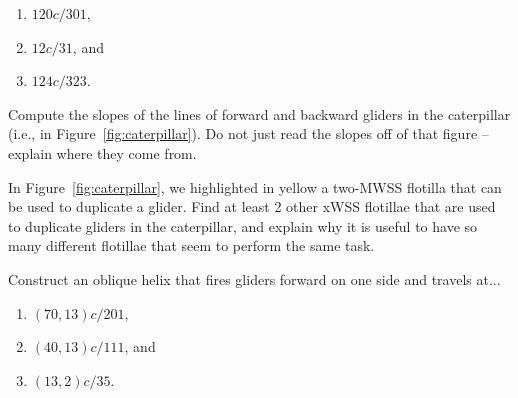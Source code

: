 \begin{multicols}{2}
\begin{problem}
	\begin{enumerate}[label=\bf\color{ocre}(\alph*)]
		\item $120c/301$,%
		
		\item $12c/31$, and%
		
		\item $124c/323$.%
	\end{enumerate}
\end{problem}


\mfilbreak


\begin{problem}\label{exer:caterpillar_glider_slopes}
	Compute the slopes of the lines of forward and backward gliders in the caterpillar (i.e., in Figure~\ref{fig:caterpillar}). Do not just read the slopes off of that figure -- explain where they come from.
\end{problem}


\mfilbreak


\begin{problem}\label{exer:caterpillar_glider_duplicate}
	In Figure~\ref{fig:caterpillar}, we highlighted in yellow a two-MWSS flotilla that can be used to duplicate a glider. Find at least 2 other xWSS flotillae that are used to duplicate gliders in the caterpillar, and explain why it is useful to have so many different flotillae that seem to perform the same task.
\end{problem}


\mfilbreak


\begin{problem}\label{exer:construct_oblique_helix}
	Construct an oblique helix that fires gliders forward on one side and travels at...
	
	\begin{enumerate}[label=\bf\color{ocre}(\alph*)]
		\item $(70,13)c/201$,%
		
		\item $(40,13)c/111$, and%
		
		\item $(13,2)c/35$.%
	\end{enumerate}
\end{problem}



\end{multicols}
